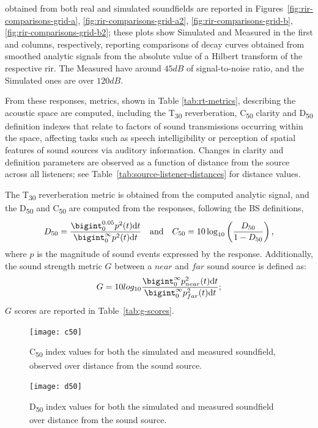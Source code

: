  obtained from both real and simulated soundfields are reported in Figures~\ref{fig:rir-comparisons-grid-a}, \ref{fig:rir-comparisons-grid-a2}, \ref{fig:rir-comparisons-grid-b}, \ref{fig:rir-comparisons-grid-b2}; these plots show Simulated and Measured  in the first and columns, respectively, reporting comparisons of decay curves obtained from smoothed analytic signals from the absolute value of a Hilbert transform of the respective \acrshort{rir}. The Measured  have around $45dB$ of signal-to-noise ratio, and the Simulated ones are over $120dB$. \par
From these responses, metrics, shown in Table \ref{tab:rt-metrics}, describing the acoustic space are computed, including the T\textsubscript{30} reverberation, C\textsubscript{50} clarity and D\textsubscript{50} definition indexes that relate to factors of sound transmissions occurring within the space, affecting tasks such as speech intelligibility or perception of spatial features of sound sources via auditory information. Changes in clarity and definition parameters are observed as a function of distance from the source across all listeners; see Table~\ref{tab:source-listener-distances} for distance values. \par
The T\textsubscript{30} reverberation metric is obtained from the computed analytic signal, and the D\textsubscript{50} and C\textsubscript{50} are computed from the responses, following the BS \cite{bs3382-1} definitions,
\begin{equation}
    D_{50} = \frac{\bigint_{0}^{0.05} p^2(t)\textrm{d}t}{\bigint_{0}^{\infty} p^2(t)\textrm{d}t}\quad \textrm{and} \quad C_{50} = 10\log_{10} \left( \frac{D_{50}}{1-D_{50}} \right)\textrm{,}
\end{equation}
where $p$ is the magnitude of sound events expressed by the response. Additionally, the sound strength metric $G$ between a $near$ and $far$ sound source is defined as:
\begin{equation}
    G = 10 log_{10} \frac{\bigint_{0}^{\infty} p_{near}^2(t)\textrm{d}t}{\bigint_{0}^{\infty} p_{far}^2(t)\textrm{d}t} \textrm{;}
\end{equation}
$G$ scores are reported in Table~\ref{tab:g-scores}.


\begin{figure}[htbp]
    \centering
    \texttt{[image: c50]}
    \caption[Ray tracing testing --- visualisation of clarity across source-listener positions]{C\textsubscript{50} index values for both the simulated and measured soundfield, observed over distance from the sound source.}
    \label{fig:c50comparison}
\end{figure}
\begin{figure}[htbp]
    \centering
    \texttt{[image: d50]}
    \caption[Ray tracing testing --- visualisation of definition across source-listener positions]{D\textsubscript{50} index values for both the simulated and measured soundfield over distance from the sound source.}
    \label{fig:d50comparison}
\end{figure}


